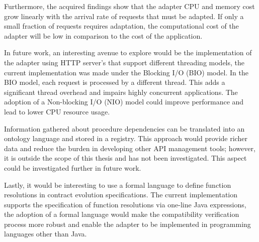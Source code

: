 Furthermore, the acquired findings show that the adapter CPU and memory cost grow linearly with the arrival rate of requests that must be adapted.
If only a small fraction of requests requires adaptation, the computational cost of the adapter will be low in comparison to the cost of the application.

In future work, an interesting avenue to explore would be the implementation of the adapter using HTTP server's that support different threading models, the current implementation
was made under the Blocking I/O (BIO) model.
In the BIO model, each request is processed by a different thread.
This adds a significant thread overhead and impairs highly concurrent applications.
The adoption of a Non-blocking I/O (NIO) model could improve performance and lead to lower CPU resource usage.

Information gathered about procedure dependencies can be translated into an ontology language and stored in a registry.
This approach would provide richer data and reduce the burden in developing other API management tools;
however, it is outside the scope of this thesis and has not been investigated.
This aspect could be investigated further in future work.

Lastly, it would be interesting to use a formal language to define function resolutions in contract evolution specifications.
The current implementation supports the specification of function resolutions via one-line Java expressions,
the adoption of a formal language would make the compatibility verification process more robust and enable the adapter to be implemented in programming languages other than Java.


